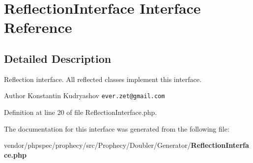 \section{Reflection\+Interface Interface Reference}
\label{interface_prophecy_1_1_doubler_1_1_generator_1_1_reflection_interface}


\subsection{Detailed Description}
Reflection interface. All reflected classes implement this interface.

\begin{DoxyAuthor}{Author}
Konstantin Kudryashov {\tt ever.\+zet@gmail.\+com} 
\end{DoxyAuthor}


Definition at line 20 of file Reflection\+Interface.\+php.



The documentation for this interface was generated from the following file\+:\begin{DoxyCompactItemize}
\item 
vendor/phpspec/prophecy/src/\+Prophecy/\+Doubler/\+Generator/{\bf Reflection\+Interface.\+php}\end{DoxyCompactItemize}
